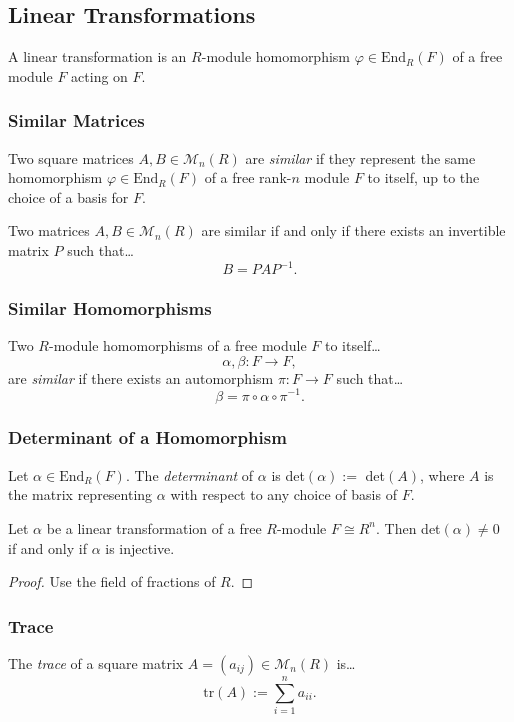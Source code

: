 \subsection{Linear Transformations}\label{lineartransformations}
A linear transformation is an $R$-module homomorphism $\varphi \in \textrm{End}_R(F)$ of a free module $F$ acting on $F$.

\subsubsection{Similar Matrices}\label{similar}
Two square matrices $A,B \in \mathcal{M}_n(R)$ are \emph{similar} if they represent the same homomorphism $\varphi \in \textrm{End}_R(F)$
of a free rank-$n$ module $F$ to itself, up to the choice of a basis for $F$.

\begin{proposition}
Two matrices $A,B \in \mathcal{M}_n(R)$ are similar if and only if there exists an invertible matrix $P$ such that\dots
$$B = P A P^{-1}.$$
\end{proposition}

\subsubsection{Similar Homomorphisms}
Two $R$-module homomorphisms of a free module $F$ to itself\dots
$$\alpha, \beta : F \rightarrow F,$$
are \emph{similar} if there exists an automorphism $\pi: F \rightarrow F$ such that\dots
$$\beta = \pi \circ \alpha \circ \pi^{-1}.$$

\subsubsection{Determinant of a Homomorphism}
Let $\alpha \in \textrm{End}_R(F)$. The \emph{determinant} of $\alpha$ is det$(\alpha) :=$ det$(A)$, where $A$ is the matrix
representing $\alpha$ with respect to any choice of basis of $F$.

\begin{proposition}
Let $\alpha$ be a linear transformation of a free $R$-module $F \cong R^n$. Then det$(\alpha) \neq 0$ if and only if $\alpha$ is injective.
\end{proposition}

\begin{proof}
Use the field of fractions of $R$.
\end{proof}

\subsubsection{Trace}\label{trace}
The \emph{trace} of a square matrix $A = (a_{ij}) \in \mathcal{M}_n(R)$ is\dots
$$\textrm{tr}(A) := \sum_{i=1}^na_{ii}.$$

